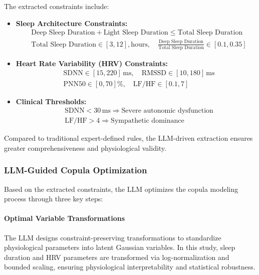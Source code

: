 \documentclass[preprint,12pt]{elsarticle}
\begin{document}
The extracted constraints include:

\begin{itemize}
\item \textbf{Sleep Architecture Constraints:}
\begin{align}
&\text{Deep Sleep Duration} + \text{Light Sleep Duration} \leq \text{Total Sleep Duration} \\
&\text{Total Sleep Duration} \in [3, 12],\text{hours},\quad \frac{\text{Deep Sleep Duration}}{\text{Total Sleep Duration}} \in [0.1, 0.35]
\end{align}

\item \textbf{Heart Rate Variability (HRV) Constraints:}
\begin{align}
    &\text{SDNN} \in [15, 220]\,\text{ms},\quad \text{RMSSD} \in [10, 180]\,\text{ms} \\
    &\text{PNN50} \in [0, 70]\%,\quad \text{LF/HF} \in [0.1, 7]
\end{align}

\item \textbf{Clinical Thresholds:}
\begin{align}
    &\text{SDNN} < 30\,\text{ms} \Rightarrow \text{Severe autonomic dysfunction} \\
    &\text{LF/HF} > 4 \Rightarrow \text{Sympathetic dominance}
\end{align}
\end{itemize}

Compared to traditional expert-defined rules, the LLM-driven extraction ensures greater comprehensiveness and physiological validity.

\subsubsection{LLM-Guided Copula Optimization}

Based on the extracted constraints, the LLM optimizes the copula modeling process through three key steps:

\paragraph{Optimal Variable Transformations} The LLM designs constraint-preserving transformations to standardize physiological parameters into latent Gaussian variables. In this study, sleep duration and HRV parameters are transformed via log-normalization and bounded scaling, ensuring physiological interpretability and statistical robustness.
\end{document}
